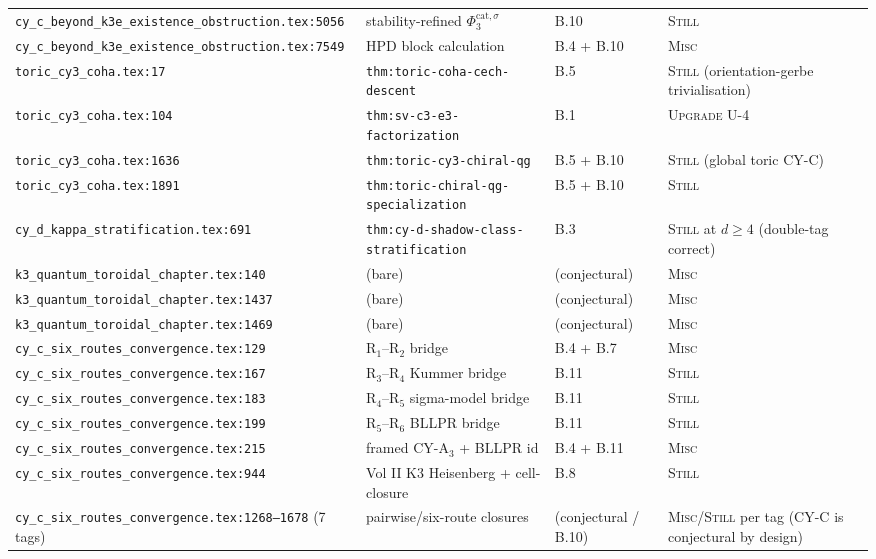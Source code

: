 \documentclass[11pt]{amsart}
\begin{document}
{{\begin{longtable}{@{}p{5.5cm}p{3cm}p{2cm}p{3.5cm}@{}}
\texttt{cy\_c\_beyond\_k3e\_existence\_obstruction.tex:5056} & stability-refined $\Phi_3^{\mathrm{cat},\sigma}$ & B.10 & \textsc{Still} \\
\texttt{cy\_c\_beyond\_k3e\_existence\_obstruction.tex:7549} & HPD block calculation & B.4 + B.10 & \textsc{Misc} \\
\texttt{toric\_cy3\_coha.tex:17} & \texttt{thm:toric-coha-cech-descent} & B.5 & \textsc{Still} (orientation-gerbe trivialisation) \\
\texttt{toric\_cy3\_coha.tex:104} & \texttt{thm:sv-c3-e3-factorization} & B.1 & \textsc{Upgrade} U-4 \\
\texttt{toric\_cy3\_coha.tex:1636} & \texttt{thm:toric-cy3-chiral-qg} & B.5 + B.10 & \textsc{Still} (global toric CY-C) \\
\texttt{toric\_cy3\_coha.tex:1891} & \texttt{thm:toric-chiral-qg-specialization} & B.5 + B.10 & \textsc{Still} \\
\texttt{cy\_d\_kappa\_stratification.tex:691} & \texttt{thm:cy-d-shadow-class-stratification} & B.3 & \textsc{Still} at $d \geq 4$ (double-tag correct) \\
\texttt{k3\_quantum\_toroidal\_chapter.tex:140} & (bare) & (conjectural) & \textsc{Misc} \\
\texttt{k3\_quantum\_toroidal\_chapter.tex:1437} & (bare) & (conjectural) & \textsc{Misc} \\
\texttt{k3\_quantum\_toroidal\_chapter.tex:1469} & (bare) & (conjectural) & \textsc{Misc} \\
\texttt{cy\_c\_six\_routes\_convergence.tex:129} & R$_1$--R$_2$ bridge & B.4 + B.7 & \textsc{Misc} \\
\texttt{cy\_c\_six\_routes\_convergence.tex:167} & R$_3$--R$_4$ Kummer bridge & B.11 & \textsc{Still} \\
\texttt{cy\_c\_six\_routes\_convergence.tex:183} & R$_4$--R$_5$ sigma-model bridge & B.11 & \textsc{Still} \\
\texttt{cy\_c\_six\_routes\_convergence.tex:199} & R$_5$--R$_6$ BLLPR bridge & B.11 & \textsc{Still} \\
\texttt{cy\_c\_six\_routes\_convergence.tex:215} & framed CY-A$_3$ + BLLPR id & B.4 + B.11 & \textsc{Misc} \\
\texttt{cy\_c\_six\_routes\_convergence.tex:944} & Vol II K3 Heisenberg + cell-closure & B.8 & \textsc{Still} \\
\texttt{cy\_c\_six\_routes\_convergence.tex:1268--1678} (7 tags) & pairwise/six-route closures & (conjectural / B.10) & \textsc{Misc}/\textsc{Still} per tag (CY-C is conjectural by design) \\


\end{longtable}}}
\end{document}
